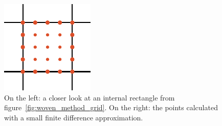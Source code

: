\begin{figure}
    \begin{minipage}{.49\textwidth}
        \begin{center}
        \end{center}
    \end{minipage}
    \hfill
    \begin{minipage}{.49\textwidth}
        \begin{center}
            \includegraphics[width=.8\textwidth]{img/chapter4/the_method_grid_interpolate.pdf}
        \end{center}
    \end{minipage}
    \caption{On the left: a closer look at an internal rectangle from figure~\ref{fig:woven_method_grid}. On the right: the points calculated with a small finite difference approximation.}\label{fig:c4_new_method_zoomed_in}
\end{figure}

